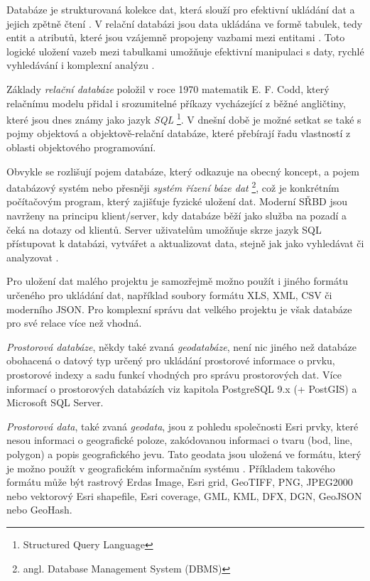 Databáze je strukturovaná kolekce dat, která slouží pro efektivní ukládání dat a jejich zpětně čtení \citep{Oppel2009}. V relační databázi jsou data ukládána ve formě tabulek, tedy entit a atributů, které jsou vzájemně propojeny vazbami mezi entitami \citep{Connolly2005}. Toto logické uložení vazeb mezi tabulkami umožňuje efektivní manipulaci s daty, rychlé vyhledávání i komplexní analýzu \citep{Momjian2001}. 

Základy {\it relační databáze} položil v roce 1970 matematik E. F. Codd, který relačnímu modelu přidal i srozumitelné příkazy vycházející z běžné angličtiny, které jsou dnes známy jako jazyk {\it SQL} \footnote{Structured Query Language}\citep{Zak2001}. V dnešní době je možné setkat se také s pojmy objektová a objektově-relační databáze, které přebírají řadu vlastností z oblasti objektového programování.

Obvykle se rozlišují pojem databáze, který odkazuje na obecný koncept, a pojem databázový systém nebo přesněji {\it systém řízení báze dat} \footnote{angl. Database Management System (DBMS)}, což je konkrétním počítačovým program, který zajišťuje fyzické uložení dat. Moderní SŘBD jsou navrženy na principu klient/server, kdy databáze běží jako služba na pozadí a čeká na dotazy od klientů. Server uživatelům umožňuje skrze jazyk SQL přístupovat k databázi, vytvářet a aktualizovat data, stejně jak jako vyhledávat či analyzovat \citep{Connolly2005}.

Pro uložení dat malého projektu je samozřejmě možno použít i jiného formátu určeného pro ukládání dat, například soubory formátu XLS, XML, CSV či moderního JSON. Pro komplexní správu dat velkého projektu je však databáze pro své relace více než vhodná. 

{\it Prostorová databáze}, někdy také zvaná {\it geodatabáze}, není nic jiného než databáze obohacená o datový typ určený pro ukládání prostorové informace o prvku, prostorové indexy a sadu funkcí vhodných pro správu prostorových dat. Více informací o prostorových databázích viz kapitola  PostgreSQL 9.x (+ PostGIS) a  Microsoft SQL Server. 

{\it Prostorová data}, také zvaná {\it geodata}, jsou z pohledu společnosti Esri prvky, které nesou informaci o geografické poloze, zakódovanou informaci o tvaru (bod, line, polygon) a popis geografického jevu. Tato geodata jsou uložená ve formátu, který je možno použít v geografickém informačním systému \citep{Esri2006}. Příkladem takového formátu může být rastrový Erdas Image, Esri grid, GeoTIFF, PNG,  JPEG2000 nebo vektorový Esri shapefile, Esri coverage, GML, KML, DFX, DGN, GeoJSON nebo GeoHash. 

